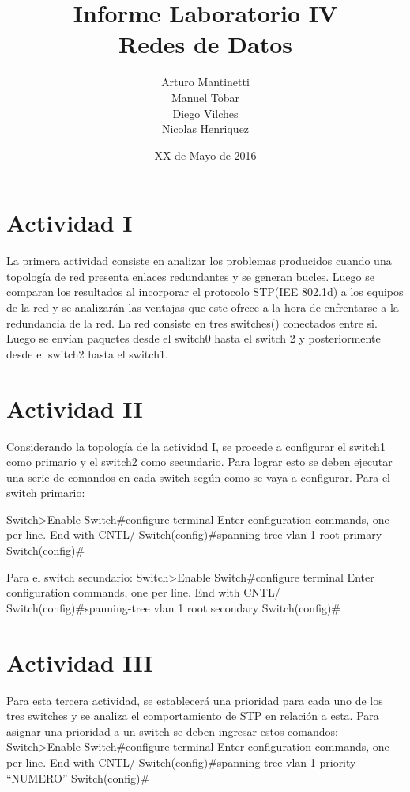 \documentclass[spanish]{udpreport}
\title{Informe Laboratorio IV \\ Redes de Datos}
\author{Arturo Mantinetti \\ Manuel Tobar \\ Diego Vilches \\ Nicolas Henriquez}
\date{XX de Mayo de 2016}
\begin{document}
\maketitle

\tableofcontents
\chapter{Actividad I}
La primera actividad consiste en analizar los problemas producidos cuando una topología de red presenta enlaces redundantes y se generan bucles. Luego se comparan los resultados al incorporar el protocolo STP(IEE 802.1d) a los equipos de la red y se analizarán las ventajas que este ofrece a la hora de enfrentarse a la redundancia de la red.
La red consiste en tres switches()  conectados entre si. Luego se envían paquetes desde el switch0 hasta el switch 2 y posteriormente desde el switch2 hasta el switch1.


\chapter{Actividad II}
Considerando la topología de la actividad I, se procede a configurar el switch1 como primario y el switch2 como secundario. Para lograr esto se deben ejecutar una serie de comandos en cada switch según como se vaya a configurar.
Para el switch primario:
 \begin{center}
    Switch>Enable
Switch#configure terminal
Enter configuration commands, one per line. End with CNTL/
Switch(config)#spanning-tree vlan 1 root primary
Switch(config)#
 \end{center}
Para el switch secundario:
 Switch>Enable
Switch#configure terminal
Enter configuration commands, one per line. End with CNTL/
Switch(config)#spanning-tree vlan 1 root secondary
Switch(config)#


\chapter{Actividad III}
Para esta tercera actividad, se establecerá una prioridad para cada uno de los tres switches y se analiza el comportamiento de STP en relación a esta. Para asignar una prioridad a un switch se deben ingresar estos comandos:
 Switch>Enable
Switch#configure terminal
Enter configuration commands, one per line. End with CNTL/
Switch(config)#spanning-tree vlan 1 priority “NUMERO”
Switch(config)#
\end{document}
